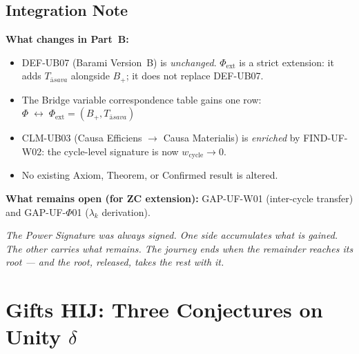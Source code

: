 \documentclass[12pt, a4paper]{article}
\providecommand{\Phiext}{\Phi_{\mathrm{ext}}}
\providecommand{\Bplus}{B_{+}}
\providecommand{\Tasava}{T_{\bar{\mathrm{a}}sava}}
\providecommand{\wcyc}{w_{\mathrm{cycle}}}
\providecommand{\Tasava}{\mathcal{T}_{\!\mathrm{\bar{a}sava}}}
\begin{document}
\subsection{Integration Note}


\begin{keybox}[title={Integration into Bridge Paper (Part~B)}]
\textbf{What changes in Part~B:}

\begin{itemize}[leftmargin=*, itemsep=2pt]
\item DEF-UB07 (Barami Version~B) is \emph{unchanged}.
  $\Phiext$ is a strict extension: it adds $\Tasava$ alongside
  $\Bplus$; it does not replace DEF-UB07.

\item The Bridge variable correspondence table gains one row:\\
  $\Phi \;\leftrightarrow\; \Phiext = (\Bplus, \Tasava)$

\item CLM-UB03 (Causa Efficiens $\to$ Causa Materialis) is
  \emph{enriched} by FIND-UF-W02: the cycle-level signature
  is now $\wcyc \to 0$.

\item No existing Axiom, Theorem, or Confirmed result is altered.
\end{itemize}

\textbf{What remains open (for ZC extension):}
GAP-UF-W01 (inter-cycle transfer) and GAP-UF-$\Phi$01
($\lambda_k$ derivation).
\end{keybox}

\bigskip
\begin{center}
\textit{The Power Signature was always signed.
One side accumulates what is gained.
The other carries what remains.
The journey ends when the remainder reaches its root
--- and the root, released, takes the rest with it.}
\end{center}





\newpage

\section{Gifts HIJ: Three Conjectures on Unity $\delta$}
\label{sec:gifts-hij}
\end{document}

